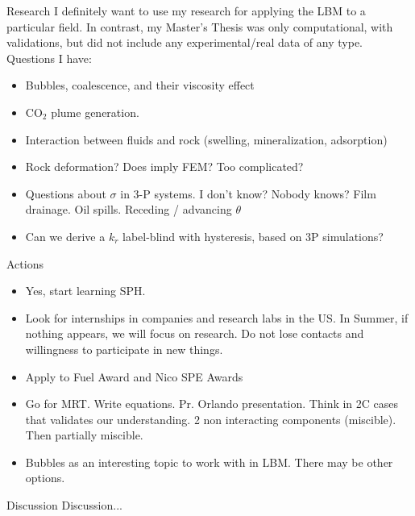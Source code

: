 \documentclass[8pt]{beamer}
\begin{document}
	\begin{frame}{Research}
		I definitely want to use my research for applying the LBM to a particular field. In contrast, my Master's Thesis was only computational, with validations, but did not include any experimental/real data of any type. Questions I have:
		\begin{itemize}
			\item Bubbles, coalescence, and their viscosity effect
			\item CO$_2$ plume generation.
			\item Interaction between fluids and rock (swelling, mineralization, adsorption)
			\item Rock deformation? Does imply FEM? Too complicated? 
			\item Questions about $\sigma$ in 3-P systems. I don't know? Nobody knows? Film drainage. Oil spills. Receding / advancing $\theta$ 
			\item Can we derive a $k_r$ label-blind with hysteresis, based on 3P simulations?
		\end{itemize}
		
	\end{frame}

	\begin{frame}{Actions}
		\begin{itemize}
			\item Yes, start learning SPH. 
			\item Look for internships in companies and research labs in the US. In Summer, if nothing appears, we will focus on research. Do not lose contacts and willingness to participate in new things.
			\item Apply to Fuel Award and Nico SPE Awards
			\item Go for MRT. Write equations. Pr. Orlando presentation. Think in 2C cases that validates our understanding. 2 non interacting components (miscible). Then partially miscible. 
			\item Bubbles as an interesting topic to work with in LBM. There may be other options.
		\end{itemize}
	\end{frame}
	
	\begin{frame}{Discussion}
		Discussion...
	\end{frame}
	
	
\end{document}

